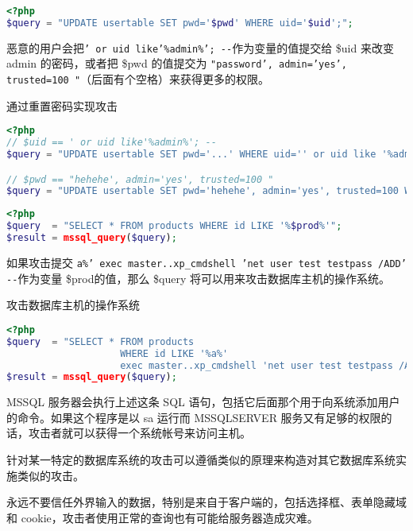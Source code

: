 \begin{lstlisting}[language=PHP]
<?php
$query = "UPDATE usertable SET pwd='$pwd' WHERE uid='$uid';";
\end{lstlisting}

恶意的用户会把\texttt{' or uid like'\%admin\%'; -\/-}作为变量的值提交给 \$uid 来改变 admin 的密码，或者把 \$pwd 的值提交为 \texttt{"password', admin='yes', trusted=100 "}（后面有个空格）来获得更多的权限。

\begin{example}
通过重置密码实现攻击
\begin{lstlisting}[language=PHP]
<?php
// $uid == ' or uid like'%admin%'; --
$query = "UPDATE usertable SET pwd='...' WHERE uid='' or uid like '%admin%'; --";

// $pwd == "hehehe', admin='yes', trusted=100 "
$query = "UPDATE usertable SET pwd='hehehe', admin='yes', trusted=100 WHERE ...;";
\end{lstlisting}
\end{example}


\begin{lstlisting}[language=PHP]
<?php
$query  = "SELECT * FROM products WHERE id LIKE '%$prod%'";
$result = mssql_query($query);
\end{lstlisting}

如果攻击提交 \texttt{a\%' exec master..xp\_cmdshell 'net user test testpass /ADD' -\/-}作为变量 \$prod的值，那么 \$query 将可以用来攻击数据库主机的操作系统。

\begin{example}
攻击数据库主机的操作系统
\begin{lstlisting}[language=PHP]
<?php
$query  = "SELECT * FROM products
                    WHERE id LIKE '%a%'
                    exec master..xp_cmdshell 'net user test testpass /ADD'--";
$result = mssql_query($query);
\end{lstlisting}
\end{example}

MSSQL 服务器会执行上述这条 SQL 语句，包括它后面那个用于向系统添加用户的命令。如果这个程序是以 sa 运行而 MSSQLSERVER 服务又有足够的权限的话，攻击者就可以获得一个系统帐号来访问主机。

针对某一特定的数据库系统的攻击可以遵循类似的原理来构造对其它数据库系统实施类似的攻击。

永远不要信任外界输入的数据，特别是来自于客户端的，包括选择框、表单隐藏域和 cookie，攻击者使用正常的查询也有可能给服务器造成灾难。


